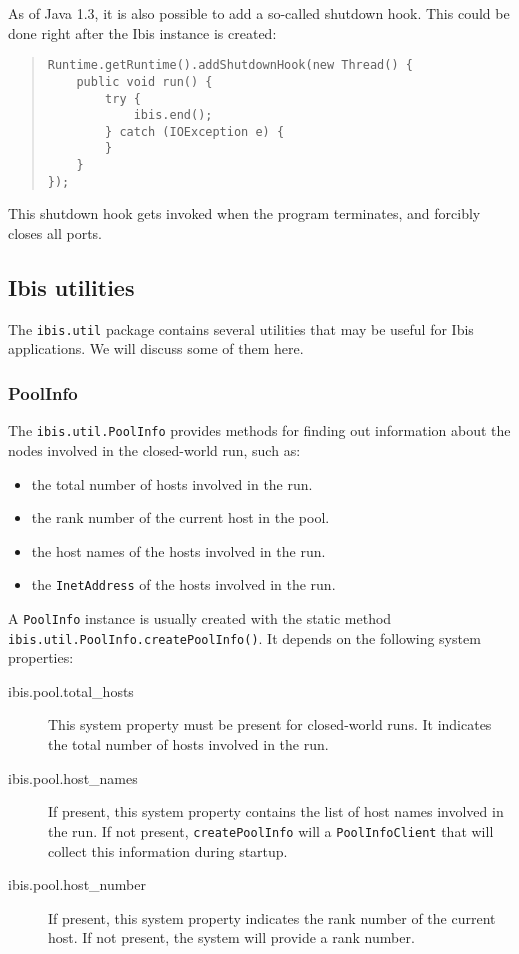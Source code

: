 \documentclass[10pt]{article}
\newcommand{\mysubsection}[1]{\subsection{#1}\label{#1}}
\newcommand{\mysubsubsection}[1]{\subsubsection{#1}\label{#1}}
\begin{document}
As of Java 1.3, it is also possible to add a so-called shutdown hook.
This could be done right after the Ibis instance is created:
\begin{quote}
\begin{verbatim}
Runtime.getRuntime().addShutdownHook(new Thread() {
    public void run() {
        try {
            ibis.end();
        } catch (IOException e) {
        }
    }
});
\end{verbatim}
\end{quote}
\noindent
This shutdown hook gets invoked when the program terminates, and
forcibly closes all ports.

\mysubsection{Ibis utilities}

The \verb+ibis.util+ package contains several utilities that may be
useful for Ibis applications. We will discuss some of them here.

\mysubsubsection{PoolInfo}

The \verb+ibis.util.PoolInfo+ 
provides methods for finding out information about the nodes
involved in the closed-world run, such as:
\begin{itemize}
\item
the total number of hosts involved in the run.
\item
the rank number of the current host in the pool.
\item
the host names of the hosts involved in the run.
\item
the \verb+InetAddress+ of the hosts involved in the run.
\end{itemize}

A \verb+PoolInfo+ instance is usually created with the 
static method \verb+ibis.util.PoolInfo.createPoolInfo()+.
It depends on the following system properties:
\begin{description}
\item[ibis.pool.total\_hosts]
This system property must be present for closed-world runs.
It indicates the total number of hosts involved in the run.
\item[ibis.pool.host\_names]
If present, this system property contains the list of host names
involved in the run.
If not present, \verb+createPoolInfo+ will a \verb+PoolInfoClient+
that will collect this information during startup.
\item[ibis.pool.host\_number]
If present, this system property indicates the rank number of the
current host. If not present, the system will provide a rank number.
\end{description}
\end{document}
